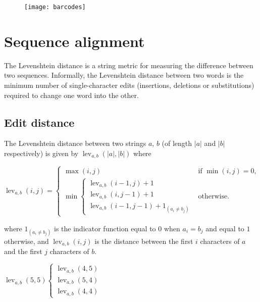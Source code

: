 \documentclass[slidestop]{beamer}
\begin{document}
\begin{pframe}
  \begin{figure}[]
    \begin{center}
      \texttt{[image: barcodes]}
    \end{center}
    \caption{}
    \label{}
  \end{figure}
\end{pframe}


\section{Sequence alignment}
\begin{pframe}
  The Levenshtein distance is a string metric for measuring the difference
  between two sequences. Informally, the Levenshtein distance between two words
  is the minimum number of single-character edits (insertions, deletions or
  substitutions) required to change one word into the other.
  \vfill

\end{pframe}

\subsection{Edit distance}
\begin{pframe}
  The Levenshtein distance between two strings $a$, $b$ (of length $|a|$ and
  $|b|$ respectively) is given by $\operatorname{lev}_{a, b}(|a|, |b|)$ where
  \bigskip

  \begin{math}
    \operatorname{lev}_{a, b}(i, j) = \begin{cases}
      \max(i, j) & \text{if } \min(i, j) = 0, \\
      \min \begin{cases}
        \operatorname{lev}_{a, b}(i - 1, j) + 1 \\
        \operatorname{lev}_{a, b}(i, j - 1) + 1 \\
        \operatorname{lev}_{a, b}(i - 1, j - 1) + 1_{(a_i \neq b_j)}
      \end{cases} & \text{otherwise.}
    \end{cases}
  \end{math}
  \bigskip

  where  $1_{(a_i \neq b_j)}$ is the indicator function equal to $0$ when
  $a_i = b_j$ and equal to $1$ otherwise, and $\operatorname{lev}_{a, b}(i, j)$
  is the distance between the first $i$ characters of $a$ and the first $j$
  characters of $b$.
  \vfill

\end{pframe}
  \begin{math}
    \operatorname{lev}_{a, b}(5, 5) \begin{cases}
      \operatorname{lev}_{a, b}(4, 5) \\
      \operatorname{lev}_{a, b}(5, 4) \\
      \operatorname{lev}_{a, b}(4, 4)
    \end{cases}
  \end{math}
\end{document}
